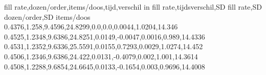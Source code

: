 fill rate,dozen/order,items/doos,tijd,verschil in fill rate,tijdsverschil,SD fill rate,SD dozen/order,SD items/doos
0.4376,1.258,9.4596,24.8299,0.0,0.0,0.0044,1.0204,14.346
0.4525,1.2348,9.6386,24.8251,0.0149,-0.0047,0.0016,0.989,14.4336
0.4531,1.2352,9.6336,25.5591,0.0155,0.7293,0.0029,1.0274,14.452
0.4506,1.2346,9.6386,24.422,0.0131,-0.4079,0.002,1.001,14.3614
0.4508,1.2288,9.6854,24.6645,0.0133,-0.1654,0.003,0.9696,14.4008
